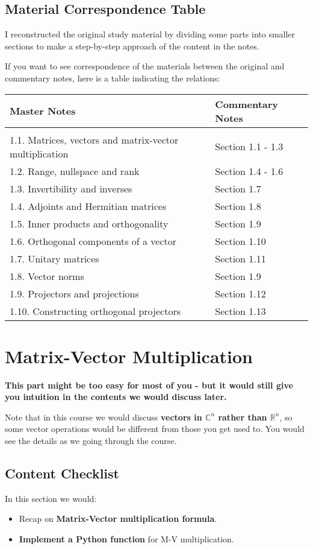 \subsection*{Material Correspondence Table}
I reconstructed the original study material by dividing some parts into smaller sections to make a step-by-step approach of the content in the notes. \smallskip

\noindent If you want to see correspondence of the materials between the original and commentary notes, here is a table indicating the relations: \bigskip

\noindent 
\begin{tabular}{ll}
  Master Notes & Commentary Notes \\
  \hline \\
  1.1. Matrices, vectors and matrix-vector multiplication & Section 1.1 - 1.3 \\
  1.2. Range, nullspace and rank & Section 1.4 - 1.6 \\
  1.3. Invertibility and inverses & Section 1.7  \\
  1.4. Adjoints and Hermitian matrices & Section 1.8 \\
  1.5. Inner products and orthogonality & Section 1.9 \\
  1.6. Orthogonal components of a vector & Section 1.10\\
  1.7. Unitary matrices & Section 1.11  \\
  1.8. Vector norms & Section 1.9\\
  1.9. Projectors and projections &  Section 1.12 \\
  1.10. Constructing orthogonal projectors  & Section 1.13
  \end{tabular}
\newpage
\section{Matrix-Vector Multiplication}%
\textbf{This part might be too easy for most of you - but it would still give you intuition in the contents we would discuss later.}\medskip

\noindent Note that in this course we would discuss \textbf{vectors in \(\mathbb{C}^{n}\) rather than \(\mathbb{R}^{n}\)}, so some vector operations would be different from those you get used to. You would see the details as we going through the course.
\subsection*{Content Checklist}
\noindent In this section we would:
\begin{itemize}
  \item Recap on \textbf{Matrix-Vector multiplication formula}. 
  \item \textbf{Implement a Python function} for M-V multiplication.
\end{itemize}
